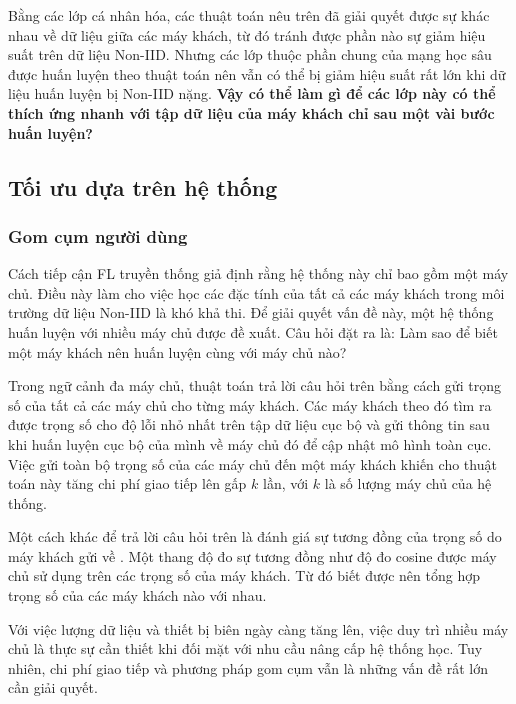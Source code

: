 \label{open_question}
Bằng các lớp cá nhân hóa, các thuật toán nêu trên đã giải quyết được sự khác nhau về dữ liệu giữa các máy khách, từ đó tránh được phần nào sự giảm hiệu suất trên dữ liệu Non-IID. Nhưng các lớp thuộc phần chung của mạng học sâu được huấn luyện theo thuật toán  nên vẫn có thể bị giảm hiệu suất rất lớn khi dữ liệu huấn luyện bị Non-IID nặng. \textbf{Vậy có thể làm gì để các lớp này có thể thích ứng nhanh với tập dữ liệu của máy khách chỉ sau một vài bước huấn luyện?}

\subsection{Tối ưu dựa trên hệ thống}

\subsubsection{Gom cụm người dùng}

Cách tiếp cận FL truyền thống giả định rằng hệ thống này chỉ bao gồm một máy chủ. Điều này làm cho việc học các đặc tính của tất cả các máy khách trong môi trường dữ liệu Non-IID là khó khả thi. Để giải quyết vấn đề này, một hệ thống huấn luyện với nhiều máy chủ được đề xuất. Câu hỏi đặt ra là: Làm sao để biết một máy khách nên huấn luyện cùng với máy chủ nào? 

Trong ngữ cảnh đa máy chủ, thuật toán  \cite{ghosh2020efficient} trả lời câu hỏi trên bằng cách gửi trọng số của tất cả các máy chủ cho từng máy khách. Các máy khách theo đó tìm ra được trọng số cho độ lỗi nhỏ nhất trên tập dữ liệu cục bộ và gửi thông tin sau khi huấn luyện cục bộ của mình về máy chủ đó để cập nhật mô hình toàn cục. Việc gửi toàn bộ trọng số của các máy chủ đến một máy khách khiến cho thuật toán này tăng chi phí giao tiếp lên gấp $k$ lần, với $k$ là số lượng máy chủ của hệ thống.

Một cách khác để trả lời câu hỏi trên là đánh giá sự tương đồng của trọng số do máy khách gửi về \cite{zhu2021federated}. Một thang độ đo sự tương đồng như độ đo cosine được máy chủ sử dụng trên các trọng số của máy khách. Từ đó biết được nên tổng hợp trọng số của các máy khách nào với nhau.

Với việc lượng dữ liệu và thiết bị biên ngày càng tăng lên, việc duy trì nhiều máy chủ là thực sự cần thiết khi đối mặt với nhu cầu nâng cấp hệ thống học. Tuy nhiên, chi phí giao tiếp và phương pháp gom cụm vẫn là những vấn đề rất lớn cần giải quyết.


